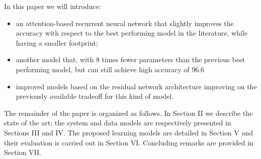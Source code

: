 In this paper we will introduce:
\begin{itemize}
  \item an attention-based recurrent neural network that slightly improves the accuracy with respect to the best performing model in the literature, while having a smaller footprint; 

  \item another model that, with 8 times fewer parameters than the previous best performing model, but can still achieve high accuracy of 96.6%
  \item improved models based on the residual network architecture improving on the previously available tradeoff for this kind of model.

\end{itemize}


The remainder of the paper is organized as follows. In Section II we describe the state of the art; the system and data models are respectively presented in Sections III and IV. The proposed learning models are detailed in Section V and their evaluation is carried out in Section VI.
Concluding remarks are provided in Section VII.
